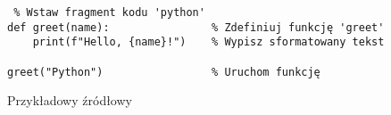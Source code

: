 \begin{listing}[htb]            %
\begin{verbatim} % Wstaw fragment kodu 'python'
def greet(name):                % Zdefiniuj funkcję 'greet'
    print(f"Hello, {name}!")    % Wypisz sformatowany tekst

greet("Python")                 % Uruchom funkcję
\end{verbatim}                    %
\caption{Przykładowy źródłowy}  %
\label{nazwa_listingu}          %
\end{listing}                   %
